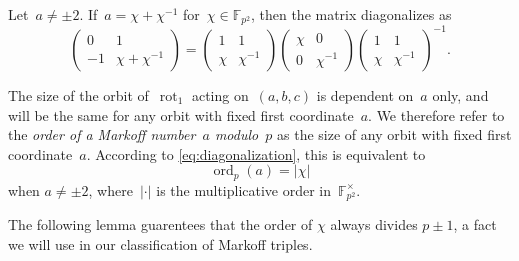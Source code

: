 \documentclass{article}
\DeclareMathOperator{\rot}{rot}
\DeclareMathOperator{\ord}{ord}
\theoremstyle{definition}
\theoremstyle{remark}
\begin{document}
Let~$a \neq \pm 2$.
If~$a = \chi + \chi^{-1}$ for~$\chi \in \mathbb{F}_{p^2}$, then the matrix diagonalizes as
\begin{equation}
    \begin{pmatrix*} 0 & 1 \\ -1 & \chi + \chi^{-1} \end{pmatrix*} =
    \begin{pmatrix*}
        1 & 1 \\
        \chi & \chi^{-1}
    \end{pmatrix*}
    \begin{pmatrix*}
        \chi & 0 \\
        0 & \chi^{-1}
    \end{pmatrix*}
    \begin{pmatrix*}
        1 & 1 \\
        \chi & \chi^{-1}
    \end{pmatrix*}^{-1}. \label{eq:diagonalization}
\end{equation}

The size of the orbit of~$\rot_1$ acting on~$(a, b, c)$ is dependent on~$a$ only, and will be the same for any orbit with fixed first coordinate~$a$.
We therefore refer to the \textit{order of a Markoff number~$a$ modulo~$p$} as the size of any orbit with fixed first coordinate~$a$.
According to \eqref{eq:diagonalization}, this is equivalent to
\[ \ord_p(a) =  |\chi| \]
when $a \neq \pm 2$, where~$|\cdot|$ is the multiplicative order in~$\mathbb{F}_{p^2}^\times$.

The following lemma guarentees that the order of $\chi$ always divides $p \pm 1$, a fact we will use in our classification of Markoff triples.
\end{document}
